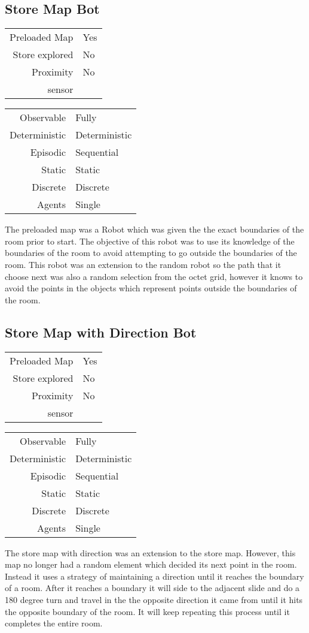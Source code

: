 \documentclass[letterpaper]{article}
\begin{document}
\subsection{Store Map Bot}

\begin{tabular}{ r | l }  
	Preloaded Map 		& Yes \\
	Store explored 		& No \\
	Proximity  		 	& No \\
	sensor 					 \\
\end{tabular}
\quad
\begin{tabular}{ r | l }  
	Observable 		& Fully 		\\
	Deterministic 	& Deterministic \\
	Episodic		& Sequential	\\
	Static		 	& Static 		\\
	Discrete 		& Discrete 		\\
	Agents		 	& Single 		\\	
\end{tabular}
The preloaded map was a Robot which was given the the exact boundaries of the room prior to start. The objective of this robot was to use its knowledge of the boundaries of the room to avoid attempting to go outside the boundaries of the room. This robot was an extension to the random robot so the path that it choose next was also a random selection from the octet grid, however it knows to avoid the points in the objects which represent points outside the boundaries of the room.

\subsection{Store Map with Direction Bot}
\begin{tabular}{ r | l }  
	Preloaded Map 		& Yes \\
	Store explored		& No \\
	Proximity 		 	& No \\
	sensor 					 \\
\end{tabular}
\quad
\begin{tabular}{ r | l }  
	Observable		& Fully 		\\
	Deterministic	& Deterministic \\
	Episodic		& Sequential	\\
	Static		 	& Static 		\\
	Discrete 		& Discrete 		\\
	Agents		 	& Single 		\\	
\end{tabular}
The store map with direction was an extension to the store map. However, this map no longer had a random element which decided its next point in the room. Instead it uses a strategy of maintaining a direction until it reaches the boundary of a room. After it reaches a boundary it will side to the adjacent slide and do a 180 degree turn and travel in the the opposite direction it came from until it hits the opposite boundary of the room. It will keep repeating this process until it completes the entire room.
\end{document}
